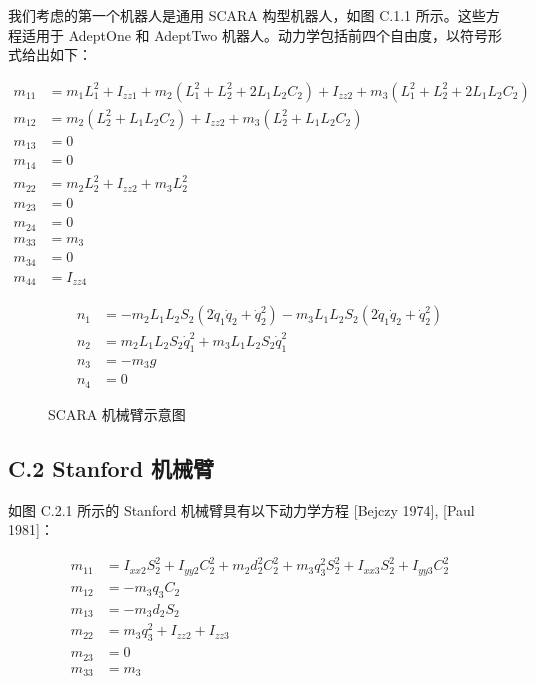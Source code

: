 \documentclass[UTF8]{ctexart}
\begin{document}
我们考虑的第一个机器人是通用 SCARA 构型机器人，如图 C.1.1 所示。这些方程适用于 AdeptOne 和 AdeptTwo 机器人。动力学包括前四个自由度，以符号形式给出如下：

\begin{align}
m_{11} &= m_1L_1^2 + I_{zz1} + m_2(L_1^2 + L_2^2 + 2L_1L_2C_2) + I_{zz2} + m_3(L_1^2 + L_2^2 + 2L_1L_2C_2) \\
m_{12} &= m_2(L_2^2 + L_1L_2C_2) + I_{zz2} + m_3(L_2^2 + L_1L_2C_2) \\
m_{13} &= 0 \\
m_{14} &= 0 \\
m_{22} &= m_2L_2^2 + I_{zz2} + m_3L_2^2 \\
m_{23} &= 0 \\
m_{24} &= 0 \\
m_{33} &= m_3 \\
m_{34} &= 0 \\
m_{44} &= I_{zz4}
\end{align}

\begin{align}
n_1 &= -m_2L_1L_2S_2(2\dot{q}_1\dot{q}_2 + \dot{q}_2^2) - m_3L_1L_2S_2(2\dot{q}_1\dot{q}_2 + \dot{q}_2^2) \\
n_2 &= m_2L_1L_2S_2\dot{q}_1^2 + m_3L_1L_2S_2\dot{q}_1^2 \\
n_3 &= -m_3g \\
n_4 &= 0
\end{align}

\begin{figure}[H]
\centering
{}
\caption{SCARA 机械臂示意图}
\end{figure}

\subsection*{C.2 Stanford 机械臂}

如图 C.2.1 所示的 Stanford 机械臂具有以下动力学方程 [Bejczy 1974], [Paul 1981]：

\begin{align}
m_{11} &= I_{xx2}S_2^2 + I_{yy2}C_2^2 + m_2d_2^2C_2^2 + m_3q_3^2S_2^2 + I_{xx3}S_2^2 + I_{yy3}C_2^2 \\
m_{12} &= -m_3q_3C_2 \\
m_{13} &= -m_3d_2S_2 \\
m_{22} &= m_3q_3^2 + I_{zz2} + I_{zz3} \\
m_{23} &= 0 \\
m_{33} &= m_3
\end{align}
\end{document}
